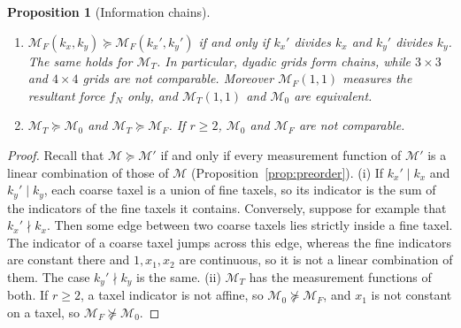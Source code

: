 \documentclass[11pt,a4paper]{article}
\theoremstyle{plain}
\newtheorem{proposition}[theorem]{Proposition}
\begin{document}
\begin{proposition}[Information chains]
\label{prop:grid_chain}
    \begin{enumerate}[label=(\roman*)]
        \item $\mathcal M_F(k_x,k_y)\succeq\mathcal M_F(k_x',k_y')$ if and only if $k_x'$ divides $k_x$ and $k_y'$ divides $k_y$. The same holds for $\mathcal M_T$.
        In particular, dyadic grids form chains, while $3\times3$ and $4\times4$ grids are not comparable. Moreover $\mathcal M_F(1,1)$ measures the resultant force $f_N$ only, and
        $\mathcal M_T(1,1)$ and $\mathcal M_0$ are equivalent.
        \item $\mathcal M_T\succeq\mathcal M_0$ and $\mathcal M_T\succeq\mathcal M_F$. If $r\ge2$, $\mathcal M_0$ and $\mathcal M_F$ are not comparable.
    \end{enumerate}
\end{proposition}
\begin{proof}
    Recall that $\mathcal M\succeq\mathcal M'$ if and only if every measurement function of $\mathcal M'$ is a linear combination of those of $\mathcal M$ (Proposition~\ref{prop:preorder}).
    (i) If $k_x'\mid k_x$ and $k_y'\mid k_y$, each coarse taxel is a union of fine taxels, so its indicator is the sum of the indicators of the fine taxels it contains.
    Conversely, suppose for example that $k_x'\nmid k_x$. Then some edge between two coarse taxels lies strictly inside a fine taxel. The indicator of a coarse taxel jumps across this edge,
    whereas the fine indicators are constant there and $1,x_1,x_2$ are continuous, so it is not a linear combination of them. The case $k_y'\nmid k_y$ is the same.
    (ii) $\mathcal M_T$ has the measurement functions of both. If $r\ge2$, a taxel indicator is not affine, so $\mathcal M_0\not\succeq\mathcal M_F$, and $x_1$ is not constant on a taxel, so $\mathcal M_F\not\succeq\mathcal M_0$.
\end{proof}

\end{document}
